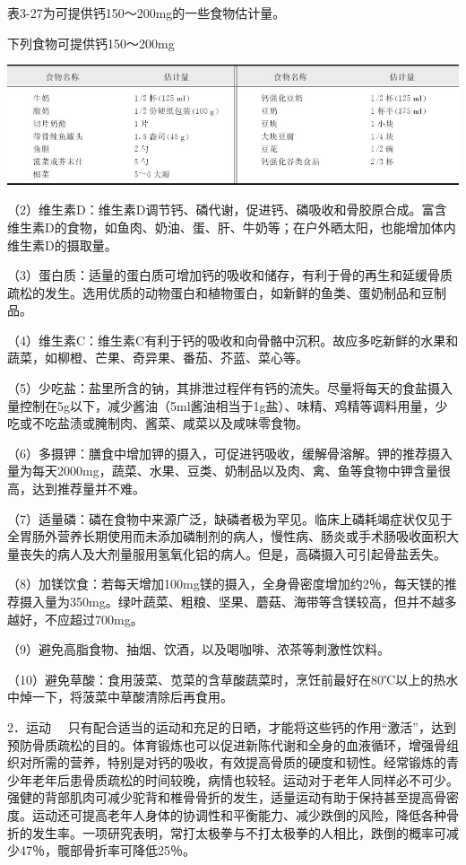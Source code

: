 表3-27为可提供钙150～200mg的一些食物估计量。

\begin{table}[htbp]
\centering
\caption{下列食物可提供钙150～200mg}
\label{tab3-27}
\includegraphics{./images/Image00044.jpg}
\end{table}

（2）维生素D：维生素D调节钙、磷代谢，促进钙、磷吸收和骨胶原合成。富含维生素D的食物，如鱼肉、奶油、蛋、肝、牛奶等；在户外晒太阳，也能增加体内维生素D的摄取量。

（3）蛋白质：适量的蛋白质可增加钙的吸收和储存，有利于骨的再生和延缓骨质疏松的发生。选用优质的动物蛋白和植物蛋白，如新鲜的鱼类、蛋奶制品和豆制品。

（4）维生素C：维生素C有利于钙的吸收和向骨骼中沉积。故应多吃新鲜的水果和蔬菜，如柳橙、芒果、奇异果、番茄、芥蓝、菜心等。

（5）少吃盐：盐里所含的钠，其排泄过程伴有钙的流失。尽量将每天的食盐摄入量控制在5g以下，减少酱油（5ml酱油相当于1g盐）、味精、鸡精等调料用量，少吃或不吃盐渍或腌制肉、酱菜、咸菜以及咸味零食物。

（6）多摄钾：膳食中增加钾的摄入，可促进钙吸收，缓解骨溶解。钾的推荐摄入量为每天2000mg，蔬菜、水果、豆类、奶制品以及肉、禽、鱼等食物中钾含量很高，达到推荐量并不难。

（7）适量磷：磷在食物中来源广泛，缺磷者极为罕见。临床上磷耗竭症状仅见于全胃肠外营养长期使用而未添加磷制剂的病人，慢性病、肠炎或手术肠吸收面积大量丧失的病人及大剂量服用氢氧化铝的病人。但是，高磷摄入可引起骨盐丢失。

（8）加镁饮食：若每天增加100mg镁的摄入，全身骨密度增加约2％，每天镁的推荐摄入量为350mg。绿叶蔬菜、粗粮、坚果、蘑菇、海带等含镁较高，但并不越多越好，不应超过700mg。

（9）避免高脂食物、抽烟、饮酒，以及喝咖啡、浓茶等刺激性饮料。

（10）避免草酸：食用菠菜、苋菜的含草酸蔬菜时，烹饪前最好在80℃以上的热水中焯一下，将菠菜中草酸清除后再食用。

{2．运动}
　只有配合适当的运动和充足的日晒，才能将这些钙的作用“激活”，达到预防骨质疏松的目的。体育锻炼也可以促进新陈代谢和全身的血液循环，增强骨组织对所需的营养，特别是对钙的吸收，有效提高骨质的硬度和韧性。经常锻炼的青少年老年后患骨质疏松的时间较晚，病情也较轻。运动对于老年人同样必不可少。强健的背部肌肉可减少驼背和椎骨骨折的发生，适量运动有助于保持甚至提高骨密度。运动还可提高老年人身体的协调性和平衡能力、减少跌倒的风险，降低各种骨折的发生率。一项研究表明，常打太极拳与不打太极拳的人相比，跌倒的概率可减少47％，髋部骨折率可降低25％。

